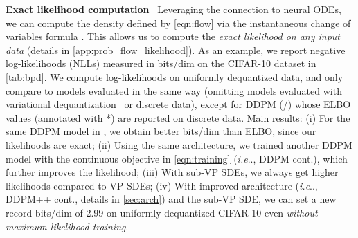 \documentclass{article} \usepackage{iclr2021_conference,times}
\makeatletter
\def\@onedot{\ifx\@let@token.\else.\null\fi\xspace}
\DeclareRobustCommand\onedot{\futurelet\@let@token\@onedot}
\def\ie{\emph{i.e}\onedot}
\makeatother
\begin{document}
\textbf{Exact likelihood computation}~ Leveraging the connection to neural ODEs, we can compute the density defined by \cref{eqn:flow}  via the instantaneous change of variables formula \citep{chen2018neural}. This allows us to compute the \emph{exact likelihood on any input data} (details in \cref{app:prob_flow_likelihood}). As an example, we report negative log-likelihoods (NLLs) measured in bits/dim on the CIFAR-10 dataset in \cref{tab:bpd}. We compute log-likelihoods on uniformly dequantized data, and only compare to models evaluated in the same way (omitting models evaluated with variational dequantization~\citep{ho2019flow++} or discrete data), except for DDPM (/) whose ELBO values (annotated with *) are reported on discrete data. Main results: (i) For the same DDPM model in \citet{ho2020denoising}, we obtain better bits/dim than ELBO, since our likelihoods are exact; (ii) Using the same architecture, we trained another DDPM model with the continuous objective in \cref{eqn:training} (\ie, DDPM cont.), which further improves the likelihood; (iii) With sub-VP SDEs, we always get higher likelihoods compared to VP SDEs; (iv) With improved architecture (\ie, DDPM++ cont., details in \cref{sec:arch}) and the sub-VP SDE, we can set a new record bits/dim of 2.99 on uniformly dequantized CIFAR-10 even \emph{without maximum likelihood training}.
\end{document}
